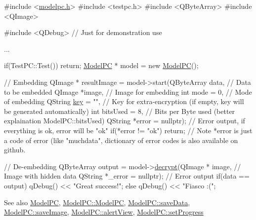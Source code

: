 \begin{DoxyCode}
\textcolor{preprocessor}{#include <\hyperlink{modelpc_8h}{modelpc.h}>}
\textcolor{preprocessor}{#include <testpc.h>}
\textcolor{preprocessor}{#include <QByteArray>}
\textcolor{preprocessor}{#include <QImage>}

\textcolor{preprocessor}{#include <QDebug>} \textcolor{comment}{// Just for demonstration use}

...

if(TestPC::Test())
    \textcolor{keywordflow}{return};
\hyperlink{class_model_p_c}{ModelPC} * model = \textcolor{keyword}{new} \hyperlink{class_model_p_c}{ModelPC}();

\textcolor{comment}{// Embedding}
QImage * resultImage = model->start(QByteArray data, \textcolor{comment}{// Data to be embedded}
                                    QImage *image, \textcolor{comment}{// Image for embedding}
                                    \textcolor{keywordtype}{int} mode = 0, \textcolor{comment}{// Mode of embedding}
                                    QString \hyperlink{namespace_errors_dict_setup_a09c268098d09ffb8e5504f30fa6d5dd9}{key} = \textcolor{stringliteral}{""}, \textcolor{comment}{// Key for extra-encryption (if empty, key will be
       generated automatically)}
                                    \textcolor{keywordtype}{int} bitsUsed = 8, \textcolor{comment}{// Bits per Byte used (better explaination
       ModelPC::bitsUsed)}
                                    QString *error = \textcolor{keyword}{nullptr}); \textcolor{comment}{// Error output, if everything is ok, error
       will be "ok"}
\textcolor{keywordflow}{if}(*error != \textcolor{stringliteral}{"ok"})
    \textcolor{keywordflow}{return};
\textcolor{comment}{// Note *error is just a code of error (like "muchdata", dictionary of error codes is also available on
       github.}

\textcolor{comment}{// De-embedding}
QByteArray output = model->\hyperlink{class_model_p_c_a5995215a34a1e1f504035715a8013809}{decrypt}(QImage * image, \textcolor{comment}{// Image with hidden data}
                                   QString *\_error = \textcolor{keyword}{nullptr}); \textcolor{comment}{// Error output}
\textcolor{keywordflow}{if}(data == output)
   qDebug() << \textcolor{stringliteral}{"Great success!"};
\textcolor{keywordflow}{else}
   qDebug() << \textcolor{stringliteral}{"Fiasco :("};
\end{DoxyCode}
 \begin{DoxySeeAlso}{See also}
\hyperlink{class_model_p_c}{Model\+PC}, \hyperlink{class_model_p_c_ae12ebe65ec973c02a0de4850a7c1e31c}{Model\+P\+C\+::\+Model\+PC}, \hyperlink{class_model_p_c_a0855107fb0ccc247cd9e893fae9bb08a}{Model\+P\+C\+::save\+Data}, \hyperlink{class_model_p_c_a41f5e2e8022679046e4d3fa1109025fa}{Model\+P\+C\+::save\+Image}, \hyperlink{class_model_p_c_af0217a7ca5671e26090dc50a5dccdaf5}{Model\+P\+C\+::alert\+View}, \hyperlink{class_model_p_c_afdcd80f0ed5062e145a71f09b0897547}{Model\+P\+C\+::set\+Progress}
\end{DoxySeeAlso}
